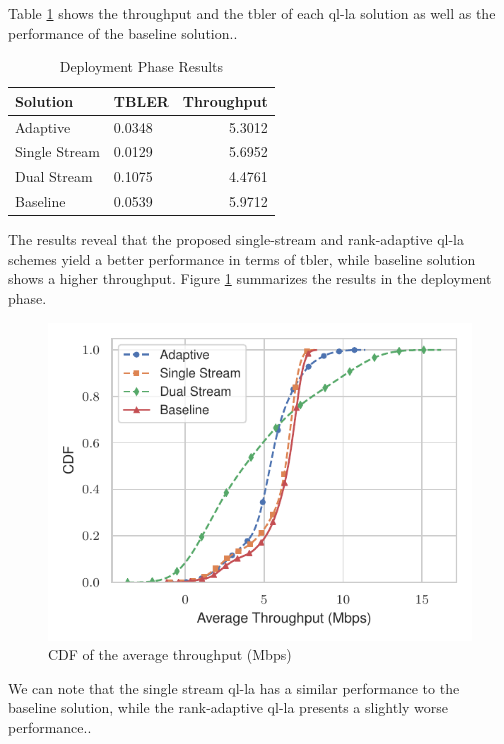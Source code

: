 Table \ref{tab:la-deploy-results} shows the throughput and the \gls{tbler} of each \gls{ql-la} solution as well as the performance of the baseline solution..
%
\begin{table}[!htb]
	\centering
	\caption{Deployment Phase Results}
	\label{tab:la-deploy-results}
	\begin{tabularx}{0.6\columnwidth}{X X r}
		\toprule
		Solution        &   TBLER   & Throughput    \\
		\midrule
		Adaptive        &   0.0348  & 5.3012       \\
		Single Stream   &   0.0129  & 5.6952        \\
		Dual Stream     &   0.1075  & 4.4761        \\
        Baseline        &   0.0539 &  5.9712        \\
		\bottomrule
	\end{tabularx}
\end{table}
%
The results reveal that the proposed single-stream and rank-adaptive \gls{ql-la} schemes yield a better performance in terms of \gls{tbler}, while baseline solution shows a higher throughput.
%
Figure \ref{fig:la-deploy-thr} summarizes the results in the deployment phase.
%
\begin{figure}[!htbp]
	\centerline{\includegraphics[width=0.6\columnwidth]{figures/chp_la/Thr_LA.pdf}}
	\caption{CDF of the average throughput (Mbps)}
	\label{fig:la-deploy-thr}
\end{figure}

We can note that the single stream \gls{ql-la} has a similar performance to the baseline solution, while the rank-adaptive \gls{ql-la} presents a slightly worse performance..




